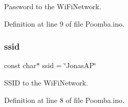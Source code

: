 Password to the Wi\+Fi\+Network. 



Definition at line 9 of file Poomba.\+ino.

\mbox{\label{_poomba_8ino_a587ba0cb07f02913598610049a3bbb79}} 
\subsubsection{\texorpdfstring{ssid}{ssid}}
{\footnotesize\ttfamily const char$\ast$ ssid = \char`\"{}Jonas\+AP\char`\"{}}



S\+S\+ID to the Wi\+Fi\+Network. 



Definition at line 8 of file Poomba.\+ino.

